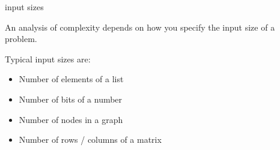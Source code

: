 \documentclass[11pt,compress,t,notes=noshow, xcolor=table]{beamer}
\begin{document}
\begin{vbframe}{input sizes}

An analysis of complexity depends on how you specify the input size of a problem.

\lz

Typical input sizes are:

\begin{itemize}
\item Number of elements of a list
\item Number of bits of a number
\item Number of nodes in a graph
\item Number of rows / columns of a matrix
\end{itemize}

\end{vbframe}
\end{document}
